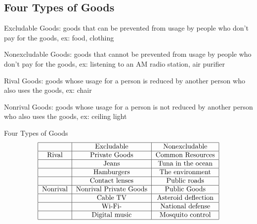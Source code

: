 \documentclass[12pt]{article}
\begin{document}
\subsection{Four Types of Goods}
\begin{definition} Excludable Goods: goods that can be prevented from usage by people who don't pay for the goods, ex: food, clothing \end{definition} 
\begin{definition} Nonexcludable Goods: goods that cannot be prevented from usage by people who don't pay for the goods, ex: listening to an AM radio station, air purifier \end{definition}
\begin{definition} Rival Goods: goods whose usage for a person is reduced by another person who also uses the goods, ex: chair \end{definition} 
\begin{definition} Nonrival Goods: goods whose usage for a person is not reduced by another person who also uses the goods, ex: ceiling light \end{definition}
Four Types of Goods $$ \begin{tabular}{|c|c|c|} \hline
& Excludable & Nonexcludable \\ \hline 
Rival & Private Goods & Common Resources \\ \hline
& Jeans & Tuna in the ocean \\ \hline
& Hamburgers & The environment \\ \hline
& Contact lenses & Public roads \\ \hline
Nonrival & Nonrival Private Goods & Public Goods \\ \hline
& Cable TV & Asteroid deflection \\ \hline
& Wi-Fi- & National defense \\ \hline
& Digital music & Mosquito control \\ \hline \end{tabular} $$ 
\end{document}
